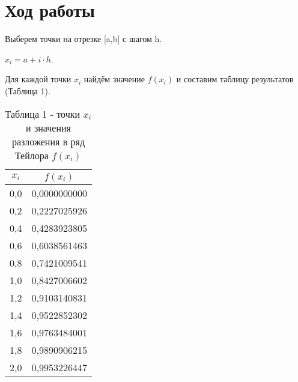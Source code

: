 \documentclass[14pt]{article}
\begin{document}
\section{Ход работы}
Выберем точки на отрезке [a,b] с шагом h.
\begin{center}
    $x_i = a + i \cdot h$.
\end{center}
Для каждой точки $x_i$ найдём значение $f(x_i)$ и составим таблицу результатов (Таблица 1).
\begin{table}[h]
    \centering
    \begin{tabular}{|c|c|}
        \hline
        $x_i$ & $f(x_i)$\\
        \hline
        0,0 & 0,0000000000\\
        \hline
        0,2 & 0,2227025926\\
        \hline
        0,4 & 0,4283923805\\
        \hline
        0,6 & 0,6038561463\\
        \hline
        0,8 & 0,7421009541\\
        \hline
        1,0 & 0,8427006602\\
        \hline
        1,2 & 0,9103140831\\
        \hline
        1,4 & 0,9522852302\\
        \hline
        1,6 & 0,9763484001\\
        \hline
        1,8 & 0,9890906215\\
        \hline
        2,0 & 0,9953226447\\
        \hline
    \end{tabular}
    \caption*{\small{Таблица 1 - точки $x_i$ и значения разложения в ряд Тейлора $f(x_i)$}}
\end{table}
\end{document}
